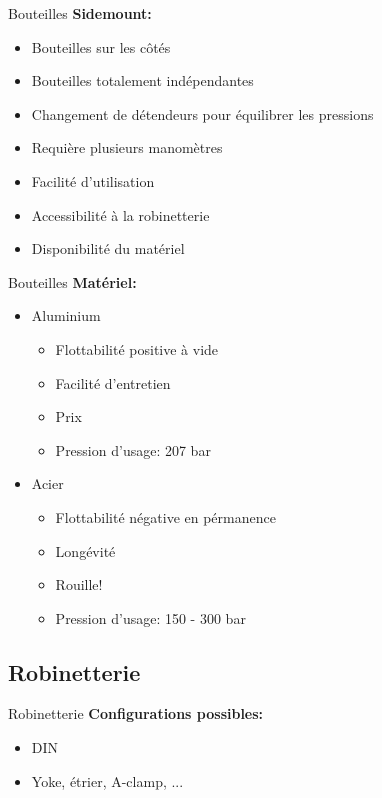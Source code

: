 \begin{frame}{Bouteilles}  
	\textbf{Sidemount:}
	\begin{itemize}
		\item Bouteilles sur les côtés
		\item Bouteilles totalement indépendantes
		\item Changement de détendeurs pour équilibrer les pressions
		\item Requière plusieurs manomètres
		\item Facilité d'utilisation
		\item Accessibilité à la robinetterie
		\item Disponibilité du matériel
	\end{itemize}
\end{frame}

\begin{frame}{Bouteilles}  
	\textbf{Matériel:}
	\begin{itemize}
			\item Aluminium
			\begin{itemize}
				\item Flottabilité positive à vide
				\item Facilité d'entretien
				\item Prix
				\item Pression d'usage: 207 bar
			\end{itemize}
			\item Acier
			\begin{itemize}
				\item Flottabilité négative en pérmanence
				\item Longévité
				\item Rouille!
				\item Pression d'usage: 150 - 300 bar
			\end{itemize}
		\end{itemize}	
\end{frame}

\subsection{Robinetterie}

\begin{frame}{Robinetterie}  
	\textbf{Configurations possibles:}
	\begin{itemize}
		\item DIN
		\item Yoke, étrier, A-clamp, ...
	\end{itemize}
\end{frame}

